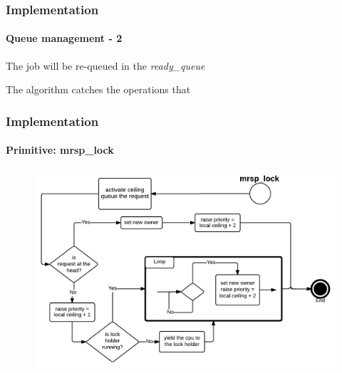 \begin{frame}

	\frametitle{Implementation}
	\framesubtitle{Queue management - 2}


	The job will be re-queued in the \emph{ready\_queue}

	\vspace{0.1cm}

	\centerline{}

	\vspace{0.1cm}

	The algorithm catches the operations that 

\begin{figure}[htb]
	\centering
		\begin{subfigure}[b]{0.99\textwidth}
			\centering
			\resizebox{\linewidth}{!}\queueFourth
		\end{subfigure}
 \end{figure}
  

\end{frame}

\begin{frame}

	\frametitle{Implementation}
	\framesubtitle{Primitive: mrsp\_lock}

	\begin{figure}
		\includegraphics[width=\linewidth]{../images/slides/slide_mrsp_lock.png}
	\end{figure}

\end{frame}

